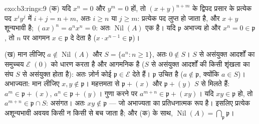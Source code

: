 \begin{solution}{exo:b3:rings:9}
(क) यदि $x^n = 0$ और $y^m = 0$ हों, तो $(x+y)^{n+m}$ के द्विपद प्रसार के प्रत्येक
पद $x^iy^j$ में $i + j = n + m$, अतः $i
\geq n$ या $j \geq m$: प्रत्येक पद लुप्त हो जाता
है, और $x + y$ शून्यभावी है; $(ax)^n = a^nx^n = 0$: अतः $\operatorname{Nil}(A)$ एक  है। यदि $\mathfrak p$
अभाज्य हो और $x^n = 0 \in \mathfrak p$, तो $n$ पर आगमन $x \in \mathfrak p$ दे देता है ($x \cdot x^{n-1} \in
\mathfrak p$)।

(ख) मान लीजिए $a \notin \operatorname{Nil}(A)$ और $S = \{a^n : n \geq
1\}$, अतः $0 \notin S$। $S$ से असंयुक्त आदर्शों
का समुच्चय $\mathcal E$ $(0)$ को धारण करता है और आगमनिक है ($S$ से
असंयुक्त आदर्शों की किसी शृंखला का संघ $S$ से असंयुक्त  होता
है): अतः ज़ोर्न कोई  $\mathfrak p \in \mathcal E$ देते हैं। $\mathfrak p$ उचित है ($a \notin \mathfrak p$,
क्योंकि $a \in S$)। अभाज्यता: मान लीजिए $x, y \notin \mathfrak p$। महत्तमता से $\mathfrak p + (x)$ और
$\mathfrak p + (y)$ $S$ से मिलते हैं: $a^m \in \mathfrak p + (x)$, $a^n
\in \mathfrak p + (y)$। गुणा करने पर $a^{m+n} \in \mathfrak p +
(xy)$। यदि
$xy \in \mathfrak p$ हो, तो $a^{m+n} \in \mathfrak p \cap
S$: असंगत। अतः $xy \notin \mathfrak p$ --- जो अभाज्यता का प्रतिधनात्मक
रूप है। इसलिए प्रत्येक अशून्यभावी अवयव किसी न किसी  से
बच जाता है; और (क) के साथ,
$\operatorname{Nil}(A) = \bigcap_{\mathfrak p} \mathfrak p$।
\end{solution}

